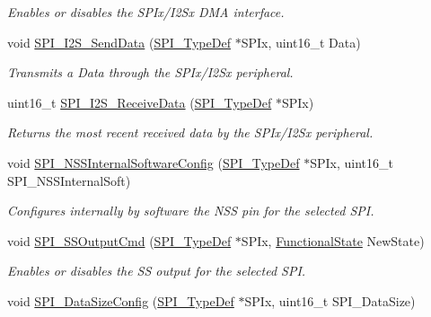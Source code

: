 \begin{DoxyCompactItemize}
\begin{DoxyCompactList}\small\item\em Enables or disables the S\+P\+Ix/\+I2\+Sx D\+MA interface. \end{DoxyCompactList}\item 
void \hyperlink{group___s_p_i___private___functions_gad5af40bebe8dbe3fa8bd476489d7e3da}{S\+P\+I\+\_\+\+I2\+S\+\_\+\+Send\+Data} (\hyperlink{struct_s_p_i___type_def}{S\+P\+I\+\_\+\+Type\+Def} $\ast$S\+P\+Ix, uint16\+\_\+t Data)
\begin{DoxyCompactList}\small\item\em Transmits a Data through the S\+P\+Ix/\+I2\+Sx peripheral. \end{DoxyCompactList}\item 
uint16\+\_\+t \hyperlink{group___s_p_i___private___functions_gab77de76547f3bff403236b263b070a30}{S\+P\+I\+\_\+\+I2\+S\+\_\+\+Receive\+Data} (\hyperlink{struct_s_p_i___type_def}{S\+P\+I\+\_\+\+Type\+Def} $\ast$S\+P\+Ix)
\begin{DoxyCompactList}\small\item\em Returns the most recent received data by the S\+P\+Ix/\+I2\+Sx peripheral. \end{DoxyCompactList}\item 
void \hyperlink{group___s_p_i___private___functions_ga56fc508a482f032f9eb80e4c63184126}{S\+P\+I\+\_\+\+N\+S\+S\+Internal\+Software\+Config} (\hyperlink{struct_s_p_i___type_def}{S\+P\+I\+\_\+\+Type\+Def} $\ast$S\+P\+Ix, uint16\+\_\+t S\+P\+I\+\_\+\+N\+S\+S\+Internal\+Soft)
\begin{DoxyCompactList}\small\item\em Configures internally by software the N\+SS pin for the selected S\+PI. \end{DoxyCompactList}\item 
void \hyperlink{group___s_p_i___private___functions_ga4ec54abdedf6cd17403d853a926d91c1}{S\+P\+I\+\_\+\+S\+S\+Output\+Cmd} (\hyperlink{struct_s_p_i___type_def}{S\+P\+I\+\_\+\+Type\+Def} $\ast$S\+P\+Ix, \hyperlink{group___exported__types_gac9a7e9a35d2513ec15c3b537aaa4fba1}{Functional\+State} New\+State)
\begin{DoxyCompactList}\small\item\em Enables or disables the SS output for the selected S\+PI. \end{DoxyCompactList}\item 
void \hyperlink{group___s_p_i___private___functions_gafc82e90841d7879535d655c035709cb1}{S\+P\+I\+\_\+\+Data\+Size\+Config} (\hyperlink{struct_s_p_i___type_def}{S\+P\+I\+\_\+\+Type\+Def} $\ast$S\+P\+Ix, uint16\+\_\+t S\+P\+I\+\_\+\+Data\+Size)

\end{DoxyCompactItemize}

